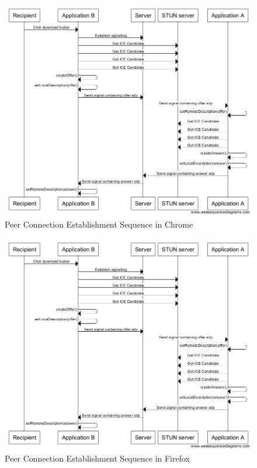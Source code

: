 \documentclass[]{report}
\begin{document}
			\begin{figure}[H]
				\caption{Peer Connection Establishment Sequence in Chrome}
				\centering
				\includegraphics[scale=0.4]{peer-connection-establishment-sequence-chrome.png}
			\end{figure}
			
			\begin{figure}[H]
				\caption{Peer Connection Establishment Sequence in Firefox}
				\centering
				\includegraphics[scale=0.4]{peer-connection-establishment-sequence-firefox.png}
			\end{figure}
			
\end{document}
